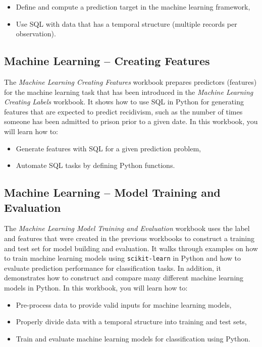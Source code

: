 \documentclass[]{krantz}
\begin{document}
\begin{itemize}
\item
  Define and compute a prediction target in the machine learning
  framework,
\item
  Use SQL with data that has a temporal structure (multiple records per
  observation).
\end{itemize}

\subsection{Machine Learning -- Creating
Features}\label{machine-learning-creating-features}

The \emph{Machine Learning Creating Features} workbook prepares
predictors (features) for the machine learning task that has been
introduced in the \emph{Machine Learning Creating Labels} workbook. It
shows how to use SQL in Python for generating features that are expected
to predict recidivism, such as the number of times someone has been
admitted to prison prior to a given date. In this workbook, you will
learn how to:

\begin{itemize}
\item
  Generate features with SQL for a given prediction problem,
\item
  Automate SQL tasks by defining Python functions.
\end{itemize}

\subsection{Machine Learning -- Model Training and
Evaluation}\label{machine-learning-model-training-and-evaluation}

The \emph{Machine Learning Model Training and Evaluation} workbook uses
the label and features that were created in the previous workbooks to
construct a training and test set for model building and evaluation. It
walks through examples on how to train machine learning models using
\texttt{scikit-learn} in Python and how to evaluate prediction
performance for classification tasks. In addition, it demonstrates how
to construct and compare many different machine learning models in
Python. In this workbook, you will learn how to:

\begin{itemize}
\item
  Pre-process data to provide valid inputs for machine learning models,
\item
  Properly divide data with a temporal structure into training and test
  sets,
\item
  Train and evaluate machine learning models for classification using
  Python.
\end{itemize}
\end{document}
